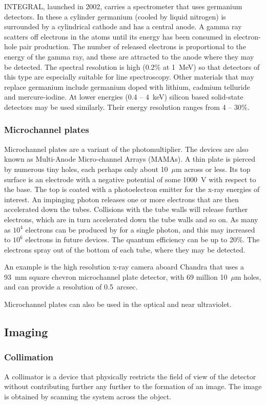 INTEGRAL, launched in 2002, carries a spectrometer that uses germanium detectors. In these
a cylinder germanium (cooled by liquid nitrogen) is surrounded by a cylindrical cathode and has
a central anode. A gamma ray scatters off electrons in the atoms until its energy has been
consumed in electron-hole pair production. The number of released electrons is proportional
to the energy of the gamma ray, and these are attracted to the anode where they may be
detected. The spectral resolution is high (0.2\% at 1~MeV) so that detectors of this type
are especially suitable for line spectroscopy. Other materials that may replace germanium
include germanium doped with lithium, cadmium telluride and mercure-iodine. At lower energies
(0.4 -- 4~keV) silicon based  solid-state detectors may be used similarly. Their energy resolution
ranges from 4 -- 30\%.

\subsubsection{Microchannel plates}
Microchannel plates are a variant of the photomultiplier. The devices 
are also known as Multi-Anode Micro-channel Arrays (MAMAs). A thin plate is pierced by numerous tiny holes, each perhaps only about 10~$\mu$m across or less. Its top surface is
an electrode with a negative potential of some 1000~V with respect to the base. The top is
coated with a photoelectron emitter for the x-ray energies of interest. An impinging photon
releases one or more electrons that are then accelerated down the tubes. Collisions with the tube
walls will release further electrons, which are in turn accelerated down the tube walls and so on.
As many as $10^4$ electrons can be produced by for a single photon, and this may increased
to $10^6$ electrons in future devices. The quantum efficiency can be up to 20\%. The electrons
spray out of the bottom of each tube, where they may be detected. 

An example is the high resolution x-ray camera aboard Chandra that uses a 93~mm square
chevron microchannel plate detector, with 69 million 10~$\mu$m holes, and can provide a
resolution of 0.5~arcsec. 

Microchannel plates can also be used in the optical and near ultraviolet.

\subsection{Imaging}

\subsubsection{Collimation}
A collimator is a device that physically restricts the field of view of the detector
without contributing further any further to the formation of an image. The image is obtained by 
scanning the system across the object. 

